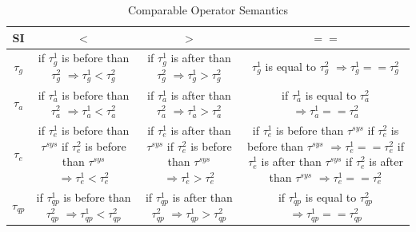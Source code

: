 \begin{table}[!htbp]
	\centering
	\caption{Comparable Operator Semantics}
	\label{tab:cos}
	\begin{tabular}{|c|c|c|c|} \hline
		SI & $<$ & $>$ & $==$ \\ \hline
        $\tau_{g}$ & \makecell{if $\tau^{1}_{g}$ is before than $\tau^{2}_{g}$ \\ $\Rightarrow \tau^{1}_{g} < \tau^{2}_{g}$} & \makecell{if $\tau^{1}_{g}$ is after than $\tau^{2}_{g}$ \\ $\Rightarrow \tau^{1}_{g} > \tau^{2}_{g}$} & \makecell{$\tau^{1}_{g}$ is equal to $\tau^{2}_{g}$ \\ $\Rightarrow \tau^{1}_{g} == \tau^{2}_{g}$} \\ \hline
		$\tau_{a}$ & \makecell{if $\tau^{1}_{a}$ is before than $\tau^{2}_{a}$ \\ $\Rightarrow \tau^{1}_{a} < \tau^{2}_{a}$} & \makecell{if $\tau^{1}_{a}$ is after than $\tau^{2}_{a}$ \\$\Rightarrow \tau^{1}_{a} > \tau^{2}_{a}$} & \makecell{if $\tau^{1}_{a}$ is equal to $\tau^{2}_{a}$ \\$\Rightarrow \tau^{1}_{a} == \tau^{2}_{a}$} \\ \hline
		$\tau_{e}$ & \makecell{if $\tau^{1}_{e}$ is before than $\tau^{sys}$ \\ if $\tau^{2}_{e}$ is before than $\tau^{sys}$ \\$\Rightarrow \tau^{1}_{e} < \tau^{2}_{e}$}& \makecell{if $\tau^{1}_{e}$ is after than $\tau^{sys}$ \\ if $\tau^{2}_{e}$ is before than $\tau^{sys}$\\$\Rightarrow \tau^{1}_{e} > \tau^{2}_{e}$} & \makecell{if $\tau^{1}_{e}$ is before than $\tau^{sys}$ \\ if $\tau^{2}_{e}$ is before than $\tau^{sys}$ \\ $\Rightarrow \tau^{1}_{e} == \tau^{2}_{e}$ \\if $\tau^{1}_{e}$ is after than $\tau^{sys}$\\if $\tau^{2}_{e}$ is after than $\tau^{sys}$\\$\Rightarrow \tau^{1}_{e} == \tau^{2}_{e}$} \\ \hline
        $\tau_{qp}$ & \makecell{if $\tau^{1}_{qp}$ is before than $\tau^{2}_{qp}$\\ $\Rightarrow \tau^{1}_{qp} < \tau^{2}_{qp}$} & \makecell{if $\tau^{1}_{qp}$ is after than $\tau^{2}_{qp}$ \\ $\Rightarrow \tau^{1}_{qp} > \tau^{2}_{qp}$} & \makecell{if $\tau^{1}_{qp}$ is equal to $\tau^{2}_{qp}$ \\ $\Rightarrow \tau^{1}_{qp} == \tau^{2}_{qp}$} \\ \hline

\end{tabular}
\end{table}
